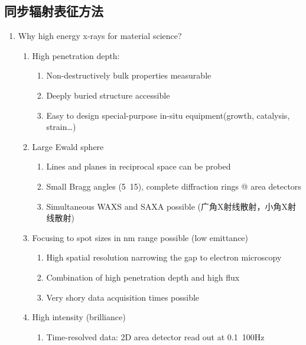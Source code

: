 \documentclass[12pt,a4paper]{article}
\begin{document}
\subsection{同步辐射表征方法}
    \begin{enumerate}
            \item Why high energy x-rays for material science?
                \begin{enumerate}
                    \item High penetration depth:
                    \begin{enumerate}
                        \item Non-destructively bulk properties measurable
                        \item Deeply buried structure accessible
                        \item Easy to design special-purpose in-situ equipment(growth, catalysis, strain\dots)
                    \end{enumerate}
                    \item Large Ewald sphere
                    \begin{enumerate}
                        \item Lines and planes in reciprocal space can be probed
                        \item Small Bragg angles (5~15), complete diffraction rings @ area detectors
                        \item Simultaneous WAXS and SAXA possible (广角X射线散射，小角X射线散射)
                    \end{enumerate}
                    \item Focusing to spot sizes in nm range possible (low emittance)
                    \begin{enumerate}
                        \item High spatial resolution narrowing the gap to electron microscopy
                        \item Combination of high penetration depth and high flux
                        \item Very shory data acquisition times possible
                    \end{enumerate}
                    \item High intensity (brilliance)
                    \begin{enumerate}
                        \item Time-resolved data: 2D area detector read out at 0.1~100Hz

\end{enumerate}
\end{enumerate}
\end{enumerate}
\end{document}
